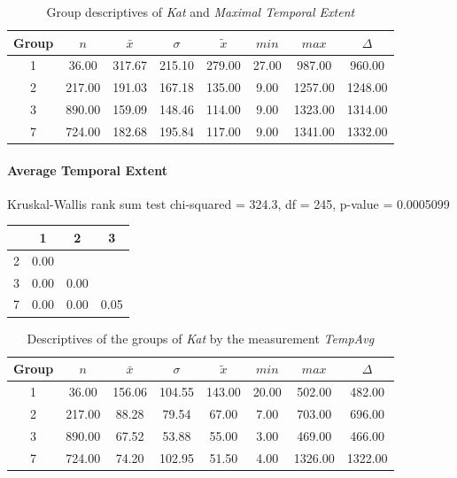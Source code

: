 \begin{table}[ht]
	\small
	\centering
	\begin{tabular}{c|c|c|c|c|c|c|c}
		\toprule
		Group & $n$ & $\bar{x}$ & $\sigma$ & $\tilde{x}$ & $min$ & $max$ & $\Delta$ \\   
	  	\midrule
		1 & 36.00 & 317.67 & 215.10 & 279.00   & 27.00 & 987.00 & 960.00  \\ 
	  	2 & 217.00 & 191.03 & 167.18 & 135.00 & 9.00 & 1257.00 & 1248.00  \\ 
	  	3 & 890.00 & 159.09 & 148.46 & 114.00 & 9.00 & 1323.00 & 1314.00  \\ 
	  	7 & 724.00 & 182.68 & 195.84 & 117.00  & 9.00 & 1341.00 & 1332.00 \\ 
	   	\bottomrule
	\end{tabular}
	\caption{Group descriptives of \textit{Kat} and \textit{Maximal Temporal Extent}}
	\label{tbl:descriptives_baysis_matched_Kat_TMax}
\end{table}

\paragraph{Average Temporal Extent}
Kruskal-Wallis rank sum test chi-squared = 324.3, df = 245, p-value = 0.0005099

\begin{table}[ht]
	\small
	\centering
	\begin{tabular}{c|c|c|c}
	  	\toprule
	 	& 1 & 2 & 3 \\ 
	  	\midrule
		2 & 0.00 &  &  \\ 
	  	3 & 0.00 & 0.00 &  \\ 
	  	7 & 0.00 & 0.00 & 0.05 \\ 
	   	\bottomrule
	\end{tabular}
\end{table}

\begin{table}[ht]
	\small
	\centering
	\begin{tabular}{c|c|c|c|c|c|c|c}
	  	\toprule
		Group & $n$ & $\bar{x}$ & $\sigma$ & $\tilde{x}$ & $min$ & $max$ & $\Delta$ \\ 
	  	\midrule
		1 &  36.00 & 156.06 & 104.55 & 143.00 & 20.00 & 502.00 & 482.00 \\ 
	  	2 & 217.00 & 88.28 & 79.54 & 67.00 & 7.00 & 703.00 & 696.00 \\ 
	  	3 & 890.00 & 67.52 & 53.88 & 55.00 & 3.00 & 469.00 & 466.00 \\ 
	  	7 & 724.00 & 74.20 & 102.95 & 51.50 & 4.00 & 1326.00 & 1322.00 \\ 
	   	\bottomrule
	\end{tabular}
	\caption{Descriptives of the groups of \textit{Kat} by the measurement \textit{TempAvg}}
\end{table}

